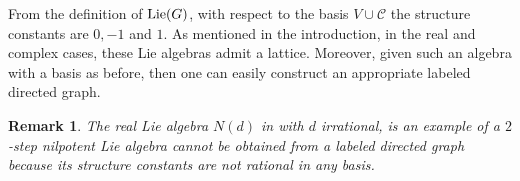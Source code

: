 \documentclass[12pt]{amsart}
\newtheorem{defn}[teo]{Definition}
\newtheorem{remark}[teo]{Remark}
\begin{document}

From the definition of ${\rm Lie}(G)$, with respect to the basis $V\cup{\mathcal C}$ the structure constants are $0,-1$ and $1$. As mentioned in the introduction, in the real and complex cases, these Lie algebras admit a lattice. Moreover, given such an algebra with a basis as before, then one can easily construct an appropriate labeled directed graph.

\begin{remark}
The real Lie algebra $N(d)$ in \cite{sch} with $d$ irrational, is an example of a $2$-step nilpotent Lie algebra cannot be obtained from a labeled directed graph because its structure constants are not rational in any basis. 
\end{remark}
\end{document}
